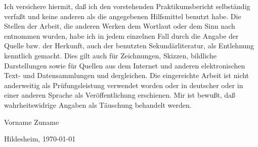 \documentclass[12pt,        %
  english,ngerman,          %
  paper=a4,                 %
  captions=tablesignature,  %
  listof=numbered,          %
  bibliography=totoc,       %
  headings=small,           %
  headinclude=false,        %
  footinclude=false,        %
  parskip=half-,            %
  oneside,                  %
  BCOR=5mm,                 %
  DIV=12                    %
  ]{scrbook}                %
\begin{document}
  {
    Ich versichere hiermit, daß ich
    den vorstehenden Praktikumsbericht
    selbständig verfaßt und keine anderen als die angegebenen Hilfsmittel
    benutzt habe. Die Stellen der Arbeit, die anderen Werken dem Wortlaut
    oder dem Sinn nach entnommen wurden, habe ich in jedem einzelnen Fall
    durch die Angabe der Quelle bzw. der Herkunft, auch der benutzten
    Sekundärliteratur, als Entlehnung kenntlich gemacht. Dies gilt auch für
    Zeichnungen, Skizzen, bildliche Darstellungen sowie für Quellen aus dem 
    Internet und anderen elektronischen Text- und Datensammlungen und
    dergleichen. Die eingereichte Arbeit ist nicht anderweitig als
    Prüfungsleistung verwendet worden oder in deutscher oder in einer anderen 
    Sprache als Veröffentlichung erschienen. Mir ist bewußt, daß
    wahrheitswidrige Angaben als Täuschung behandelt werden.
  }


\vspace*{3cm}

Vorname Zuname

% 

\vspace*{1cm}

Hildesheim, \today
\end{document}
